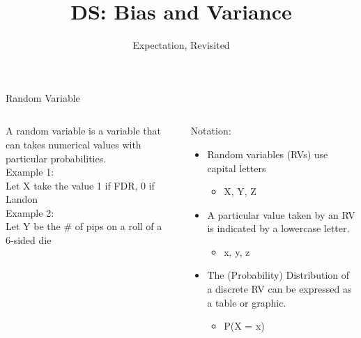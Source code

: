 \documentclass[aspectratio=169]{../latex_main/tntbeamer}  %
\title[Introduction]{DS: Bias and Variance}
\subtitle{Expectation, Revisited}
\begin{document}
	
	\maketitle
	\begin{frame}{Random Variable}
	    \begin{columns}
	        \begin{column}{.4\textwidth}
	                A random variable is a variable that can takes numerical values with particular probabilities.\\
	                \bigskip
	                Example 1:\\
                    Let X take the value 1 if FDR, 0 if \\
                    Landon\\
                    \bigskip
                    Example 2:\\
                    Let Y be the \# of pips on a roll of a \\
                    6-sided die



	        \end{column}
	        
	        
	        \begin{column}{.4\textwidth}
	            Notation:
	                \begin{itemize}
	                    \item Random variables (RVs) use capital letters
	                    \begin{itemize}
	                        \item X, Y, Z
	                    \end{itemize}
	                    \item A particular value taken by an RV is indicated by a lowercase letter.
	                    \begin{itemize}
	                        \item x, y, z
	                    \end{itemize}
	                    \item The (Probability) Distribution of a discrete RV can be expressed as a table or graphic.
	                    \begin{itemize}
	                        \item P(X = x)
	                    \end{itemize}
	                \end{itemize}
	        \end{column}
	    \end{columns}
	\end{frame}
	
\end{document}
